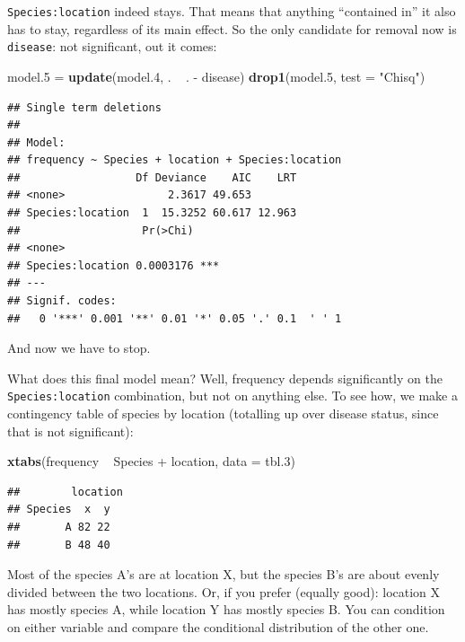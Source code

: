 \documentclass[]{tufte-book}
\newenvironment{Shaded}{}{}
\newcommand{\DataTypeTok}[1]{\textcolor[rgb]{0.56,0.13,0.00}{#1}}
\newcommand{\FloatTok}[1]{\textcolor[rgb]{0.25,0.63,0.44}{#1}}
\newcommand{\KeywordTok}[1]{\textcolor[rgb]{0.00,0.44,0.13}{\textbf{#1}}}
\newcommand{\NormalTok}[1]{#1}
\newcommand{\OperatorTok}[1]{\textcolor[rgb]{0.40,0.40,0.40}{#1}}
\newcommand{\StringTok}[1]{\textcolor[rgb]{0.25,0.44,0.63}{#1}}
\theoremstyle{definition}
\theoremstyle{definition}
\theoremstyle{definition}
\theoremstyle{remark}
\begin{document}
\texttt{Species:location} indeed stays. That means that anything
``contained in'' it also has to stay, regardless of its main effect. So
the only candidate for removal now is \texttt{disease}: not significant,
out it comes:

\begin{Shaded}
\begin{Highlighting}[]
\NormalTok{model}\FloatTok{.5}\NormalTok{ =}\StringTok{ }\KeywordTok{update}\NormalTok{(model}\FloatTok{.4}\NormalTok{, . }\OperatorTok{~}\StringTok{ }\NormalTok{. }\OperatorTok{-}\StringTok{ }\NormalTok{disease)}
\KeywordTok{drop1}\NormalTok{(model}\FloatTok{.5}\NormalTok{, }\DataTypeTok{test =} \StringTok{"Chisq"}\NormalTok{)}
\end{Highlighting}
\end{Shaded}

\begin{verbatim}
## Single term deletions
## 
## Model:
## frequency ~ Species + location + Species:location
##                  Df Deviance    AIC    LRT
## <none>                2.3617 49.653       
## Species:location  1  15.3252 60.617 12.963
##                   Pr(>Chi)    
## <none>                        
## Species:location 0.0003176 ***
## ---
## Signif. codes:  
##   0 '***' 0.001 '**' 0.01 '*' 0.05 '.' 0.1  ' ' 1
\end{verbatim}

And now we have to stop.

What does this final model mean? Well, frequency depends significantly
on the \texttt{Species:location} combination, but not on anything else.
To see how, we make a contingency table of species by location
(totalling up over disease status, since that is not significant):

\begin{Shaded}
\begin{Highlighting}[]
\KeywordTok{xtabs}\NormalTok{(frequency }\OperatorTok{~}\StringTok{ }\NormalTok{Species }\OperatorTok{+}\StringTok{ }\NormalTok{location, }\DataTypeTok{data =}\NormalTok{ tbl}\FloatTok{.3}\NormalTok{)}
\end{Highlighting}
\end{Shaded}

\begin{verbatim}
##        location
## Species  x  y
##       A 82 22
##       B 48 40
\end{verbatim}

Most of the species A's are at location X, but the species B's are about
evenly divided between the two locations. Or, if you prefer (equally
good): location X has mostly species A, while location Y has mostly
species B. You can condition on either variable and compare the
conditional distribution of the other one.
\end{document}
